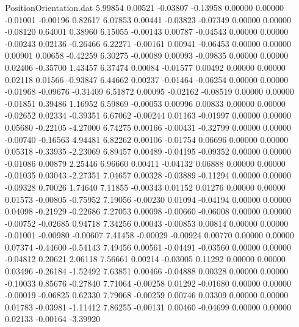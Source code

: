 \begin{filecontents}{PositionOrientation.dat}
   5.99854    0.00521   -0.03807    -0.13958    0.00000    0.00000   -0.01001   -0.00196    0.82617
   6.07853    0.00441   -0.03823    -0.07349    0.00000    0.00000   -0.08120    0.64001    0.38960
   6.15055   -0.00143    0.00787    -0.04543    0.00000    0.00000   -0.00243    0.02136   -0.26466
   6.22271   -0.00161    0.00941    -0.06453    0.00000    0.00000    0.00901    0.00658   -0.42259
   6.30275   -0.00089    0.00993    -0.09835    0.00000    0.00000    0.02406   -0.35700    1.43457
   6.37474    0.00084   -0.01577     0.00492    0.00000    0.00000    0.02118    0.01566   -0.93847
   6.44662    0.00237   -0.01464    -0.06254    0.00000    0.00000   -0.01968   -0.09676   -0.31409
   6.51872    0.00095   -0.02162    -0.08519    0.00000    0.00000   -0.01851    0.39486    1.16952
   6.59869   -0.00053    0.00996     0.00833    0.00000    0.00000   -0.02652    0.02334   -0.39351
   6.67062   -0.00244    0.01163    -0.01997    0.00000    0.00000    0.05680   -0.22105   -4.27000
   6.74275    0.00166   -0.00431    -0.32799    0.00000    0.00000   -0.00740   -0.16563    4.94481
   6.82262    0.00106   -0.01754     0.06696    0.00000    0.00000    0.05318   -0.33935   -2.23069
   6.89457    0.00489   -0.04195    -0.09352    0.00000    0.00000   -0.01086    0.00879    2.25446
   6.96660    0.00411   -0.04132     0.06888    0.00000    0.00000   -0.01035    0.03043   -2.27351
   7.04657    0.00328   -0.03889    -0.11294    0.00000    0.00000   -0.09328    0.70026    1.74640
   7.11855   -0.00343    0.01152     0.01276    0.00000    0.00000    0.01573   -0.00805   -0.75952
   7.19056   -0.00230    0.01094    -0.04194    0.00000    0.00000    0.04098   -0.21929   -0.22686
   7.27053    0.00098   -0.00660    -0.06008    0.00000    0.00000   -0.00752   -0.02685    0.94718
   7.34256    0.00043   -0.00853     0.00814    0.00000    0.00000   -0.01001   -0.00980   -0.00607
   7.41458   -0.00029   -0.00924     0.00770    0.00000    0.00000    0.07374   -0.44600   -0.54143
   7.49456    0.00561   -0.04491    -0.03560    0.00000    0.00000   -0.04812    0.20621    2.06118
   7.56661    0.00214   -0.03005     0.11292    0.00000    0.00000    0.03496   -0.26184   -1.52492
   7.63851    0.00466   -0.04888     0.00328    0.00000    0.00000   -0.10033    0.85676   -0.27840
   7.71064   -0.00258    0.01292    -0.01680    0.00000    0.00000   -0.00019   -0.06825    0.62330
   7.79068   -0.00259    0.00746     0.03309    0.00000    0.00000    0.01783   -0.03981   -1.11412
   7.86255   -0.00131    0.00460    -0.04699    0.00000    0.00000    0.02133   -0.00164   -3.39920

\end{filecontents}
